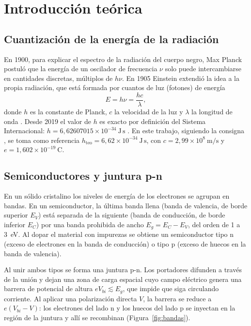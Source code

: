 \documentclass{article}
\newcommand{\Js}{\ \mathrm{J\,s}}
\begin{document}
\section{Introducción teórica}

\subsection{Cuantización de la energía de la radiación}

En 1900, para explicar el espectro de la radiación del cuerpo negro, Max Planck postuló que la energía de un oscilador de frecuencia $\nu$ solo puede intercambiarse en cantidades discretas, múltiplos de $h\nu$. En 1905 Einstein extendió la idea a la propia radiación, que está formada por cuantos de luz (fotones) de energía
\begin{equation}
    E=h\nu=\frac{hc}{\lambda},
    \label{eq:foton}
\end{equation}
donde $h$ es la constante de Planck, $c$ la velocidad de la luz y $\lambda$ la longitud de onda \cite{eisberg}. Desde 2019 el valor de $h$ es exacto por definición del Sistema Internacional: $h=6,62607015\times10^{-34}\Js$ \cite{codata}. En este trabajo, siguiendo la consigna \cite{consigna}, se toma como referencia $h_{\mathrm{teo}}=6,62\times10^{-34}\Js$, con $c=2,99\times10^{8}\ \mathrm{m/s}$ y $e=1,602\times10^{-19}\ \mathrm{C}$.

\subsection{Semiconductores y juntura p-n}

En un sólido cristalino los niveles de energía de los electrones se agrupan en bandas. En un semiconductor, la última banda llena (banda de valencia, de borde superior $E_V$) está separada de la siguiente (banda de conducción, de borde inferior $E_C$) por una banda prohibida de ancho $E_g=E_C-E_V$, del orden de 1 a 3~eV. Al dopar el material con impurezas se obtiene un semiconductor tipo n (exceso de electrones en la banda de conducción) o tipo p (exceso de huecos en la banda de valencia).

Al unir ambos tipos se forma una juntura p-n. Los portadores difunden a través de la unión y dejan una zona de carga espacial cuyo campo eléctrico genera una barrera de potencial de altura $eV_{bi}\lesssim E_g$, que impide que siga circulando corriente. Al aplicar una polarización directa $V$, la barrera se reduce a $e(V_{bi}-V)$: los electrones del lado n y los huecos del lado p se inyectan en la región de la juntura y allí se recombinan (Figura~\ref{fig:bandas}).
\end{document}
